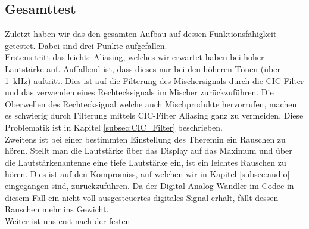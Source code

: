 \subsection{Gesamttest}\label{subsec:Gesammttest}
Zuletzt haben wir das den gesamten Aufbau auf dessen Funktionsfähigkeit getestet. Dabei sind drei Punkte aufgefallen.\\
Erstens tritt das leichte Aliasing, welches wir erwartet haben bei hoher Lautstärke auf. Auffallend ist, dass dieses nur bei den höheren Tönen (über \SI{1}{kHz}) auftritt. Dies ist auf die Filterung des Mischersignals durch die CIC-Filter und das verwenden eines Rechtecksignals im Mischer zurückzuführen. Die Oberwellen des Rechtecksignal welche auch Mischprodukte hervorrufen, machen es schwierig durch Filterung mittels CIC-Filter Aliasing ganz zu vermeiden. Diese Problematik ist in Kapitel \ref{subsec:CIC_Filter} beschrieben.\\
Zweitens ist bei einer bestimmten Einstellung des Theremin ein Rauschen zu hören. Stellt man die Lautstärke über das Display auf das Maximum und über die Lautstärkenantenne eine tiefe Lautstärke ein, ist ein leichtes Rauschen zu hören. Dies ist auf den Kompromiss, auf welchen wir in Kapitel \ref{subsec:audio} eingegangen sind, zurückzuführen. Da der Digital-Analog-Wandler im Codec in diesem Fall ein nicht voll ausgesteuertes digitales Signal erhält, fällt dessen Rauschen mehr ins Gewicht.\\
Weiter ist uns erst nach der festen


